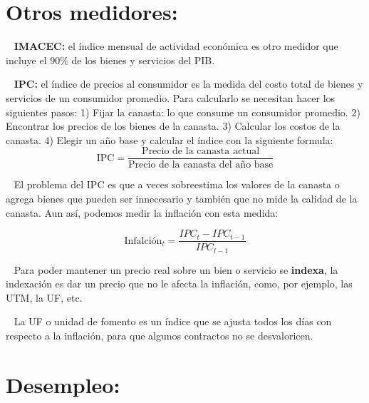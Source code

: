 \documentclass[
  letterpaper,
  DIV=11,
  numbers=noendperiod]{scrreport}
\begin{document}
\hypertarget{otros-medidores}{%
\section{Otros medidores:}\label{otros-medidores}}

~ \textbf{IMACEC:} el índice mensual de actividad económica es otro
medidor que incluye el \(90\%\) de los bienes y servicios del PIB.

~ \textbf{IPC:} el índice de precios al consumidor es la medida del
costo total de bienes y servicios de un consumidor promedio. Para
calcularlo se necesitan hacer los siguientes pasos: 1) Fijar la canasta:
lo que consume un consumidor promedio. 2) Encontrar los precios de los
bienes de la canasta. 3) Calcular los costos de la canasta. 4) Elegir un
año base y calcular el índice con la siguiente formula: \[
\text{IPC}=\frac{\text{Precio de la canasta actual}}{\text{Precio de la canasta del año base}}
\]

~ El problema del IPC es que a veces sobreestima los valores de la
canasta o agrega bienes que pueden ser innecesario y también que no mide
la calidad de la canasta. Aun así, podemos medir la inflación con esta
medida:

\[
\text{Infalción}_t=\frac{IPC_t-IPC_{t-1}}{IPC_{t-1}}
\]

~ Para poder mantener un precio real sobre un bien o servicio se
\textbf{indexa}, la indexación es dar un precio que no le afecta la
inflación, como, por ejemplo, las UTM, la UF, etc.

~ La UF o unidad de fomento es un índice que se ajusta todos los días
con respecto a la inflación, para que algunos contractos no se
desvaloricen.

\hypertarget{desempleo}{%
\section{Desempleo:}\label{desempleo}}
\end{document}
